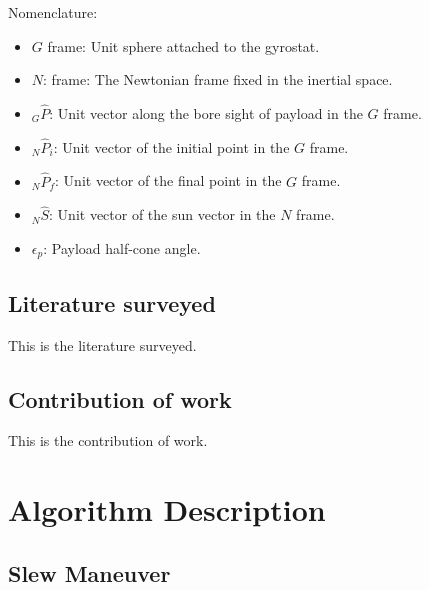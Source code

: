 \documentclass[letterpaper, preprint, paper,11pt]{AAS}	%
\begin{document}
	
		Nomenclature: 
		\begin{itemize}
			\item $G$ frame: Unit sphere attached to the gyrostat.
			\item $N$: frame: The Newtonian frame fixed in the inertial space.
			\item $_G\hat{P}$: Unit vector along the bore sight of payload in the $G$ frame.
			\item $_N\hat{P}_i$: Unit vector of the initial point in the $G$ frame.
			\item $_N\hat{P}_f$: Unit vector of the final point in the $G$ frame.
			\item $_N\hat{S}$: Unit vector of the sun vector in the $N$ frame.
			\item $\epsilon_p$: Payload half-cone angle.
		\end{itemize}
	

	\clearpage
	\subsection{Literature surveyed}
	
		This is the literature surveyed. 
	
	\subsection{Contribution of work} 
	
		This is the contribution of work. 

\section{Algorithm Description} 

	\subsection{Slew Maneuver} 
	
	
\end{document}
